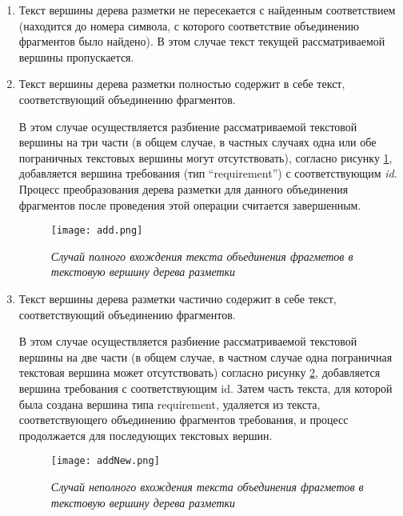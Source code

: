 \begin{enumerate}

\item Текст вершины дерева разметки не пересекается с найденным соответствием (находится до номера символа, с которого соответствие объединению фрагментов было найдено). В этом случае текст текущей рассматриваемой вершины пропускается.

\item Текст вершины дерева разметки полностью содержит в себе текст, соответствующий объединению фрагментов.

В этом случае осуществляется разбиение рассматриваемой текстовой вершины на три части (в общем случае, в частных случаях одна или обе пограничных текстовых вершины могут отсутствовать), согласно рисунку \ref{sys:add}, добавляется вершина требования (тип “requirement”) с соответствующим \emph{id}. Процесс преобразования дерева разметки для данного объединения фрагментов после проведения этой операции считается завершенным.

\begin{figure}[h]
\begin{center}
\texttt{[image: add.png]}
\caption{\emph{Случай полного вхождения текста объединения фрагметов в текстовую вершину дерева разметки}}
\label{sys:add}
\end{center}
\end{figure}

\item Текст вершины дерева разметки частично содержит в себе текст, соответствующий объединению фрагментов. 

В этом случае осуществляется разбиение рассматриваемой текстовой вершины на две части (в общем случае, в частном случае одна пограничная текстовая вершина может отсутствовать) согласно рисунку \ref{sys:addNew}, добавляется вершина требования с соответствующим id. Затем часть текста, для которой была создана вершина типа requirement, удаляется из текста, соответствующего объединению фрагментов требования, и процесс продолжается для последующих текстовых вершин.

\begin{figure}[h]
\begin{center}
\texttt{[image: addNew.png]}
\caption{\emph{Случай неполного вхождения текста объединения фрагметов в текстовую вершину дерева разметки}}
\label{sys:addNew}
\end{center}
\end{figure}

\end{enumerate}

